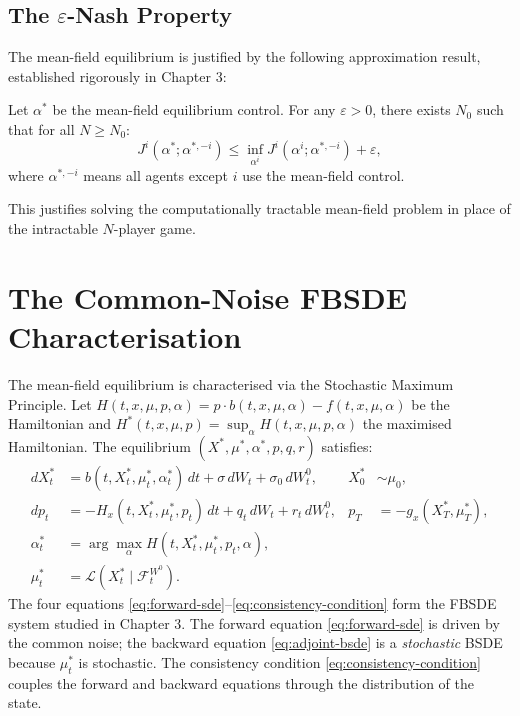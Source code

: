 \subsection{The $\varepsilon$-Nash Property}

The mean-field equilibrium is justified by the following approximation result,
established rigorously in Chapter 3:

\begin{theorem}
Let $\alpha^*$ be the mean-field equilibrium control. For any $\varepsilon > 0$,
there exists $N_0$ such that for all $N \ge N_0$:
\[
    J^i(\alpha^{*}; \alpha^{*,-i}) \le \inf_{\alpha^i} J^i(\alpha^i; \alpha^{*,-i})
    + \varepsilon,
\]
where $\alpha^{*,-i}$ means all agents except $i$ use the mean-field control.
\end{theorem}

This justifies solving the computationally tractable mean-field problem in place of
the intractable $N$-player game.

\section{The Common-Noise FBSDE Characterisation}

The mean-field equilibrium is characterised via the Stochastic Maximum Principle.
Let $H(t,x,\mu,p,\alpha) = p \cdot b(t,x,\mu,\alpha) - f(t,x,\mu,\alpha)$ be the
Hamiltonian and $H^*(t,x,\mu,p) = \sup_\alpha H(t,x,\mu,p,\alpha)$ the maximised
Hamiltonian. The equilibrium $(X^*, \mu^*, \alpha^*, p, q, r)$ satisfies:
\begin{align}
    dX_t^* &= b(t, X_t^*, \mu_t^*, \alpha_t^*)\, dt + \sigma\, dW_t + \sigma_0\,
        dW_t^0, & X_0^* &\sim \mu_0, \label{eq:forward-sde} \\
    dp_t &= -H_x(t, X_t^*, \mu_t^*, p_t)\, dt + q_t\, dW_t + r_t\, dW_t^0,
        & p_T &= -g_x(X_T^*, \mu_T^*), \label{eq:adjoint-bsde}\\
    \alpha_t^* &= \arg\max_\alpha H(t, X_t^*, \mu_t^*, p_t, \alpha),
        \label{eq:optimality-condition} \\
    \mu_t^* &= \mathcal{L}(X_t^* \mid \mathcal{F}_t^{W^0}).
        \label{eq:consistency-condition}
\end{align}
\label{eq:fbsde-system}
The four equations \eqref{eq:forward-sde}--\eqref{eq:consistency-condition} form
the FBSDE system studied in Chapter 3. The forward equation \eqref{eq:forward-sde}
is driven by the common noise; the backward equation \eqref{eq:adjoint-bsde} is a
\emph{stochastic} BSDE because $\mu_t^*$ is stochastic. The consistency condition
\eqref{eq:consistency-condition} couples the forward and backward equations through
the distribution of the state.

